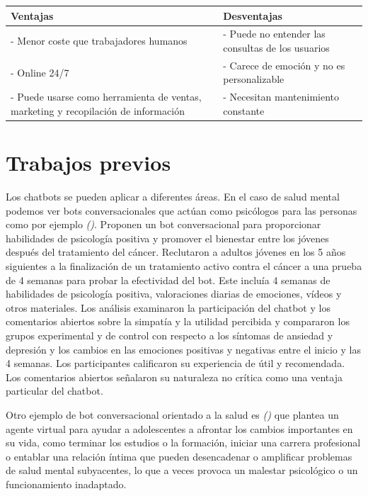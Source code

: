 {{{\begin{table}[!ht]
\begin{center}
\begin{tabular}{| p{6cm} | p{7cm} |}
\hline
\rowcolor{blueice}
\textbf{Ventajas} & \textbf{Desventajas} \\
 \hline
- Menor coste que trabajadores humanos & - Puede no entender las consultas de los usuarios \\
- Online 24/7 & - Carece de emoción y no es personalizable \\
- Puede usarse como herramienta de ventas, marketing y recopilación de información & - Necesitan mantenimiento constante \\ \hline
\end{tabular}
\end{center}
\end{table}



\section{Trabajos previos}

Los chatbots se pueden aplicar a diferentes áreas. En el caso de salud mental podemos ver bots conversacionales que actúan como psicólogos para las personas como por ejemplo \textit{(\cite{vivibot2019})}. Proponen un bot conversacional para proporcionar habilidades de psicología positiva y promover el bienestar entre los jóvenes después del tratamiento del cáncer. Reclutaron a adultos jóvenes en los 5 años siguientes a la finalización de un tratamiento activo contra el cáncer a una prueba de 4 semanas para probar la efectividad del bot. Este incluía 4 semanas de habilidades de psicología positiva, valoraciones diarias de emociones, vídeos y otros materiales. Los análisis examinaron la participación del chatbot y los comentarios abiertos sobre la simpatía y la utilidad percibida y compararon los grupos experimental y de control con respecto a los síntomas de ansiedad y depresión y los cambios en las emociones positivas y negativas entre el inicio y las 4 semanas. Los participantes calificaron su experiencia de útil y recomendada. Los comentarios abiertos señalaron su naturaleza no crítica como una ventaja particular del chatbot.{\vspace{0.3cm}

Otro ejemplo de bot conversacional orientado a la salud es \textit{(\cite{21daystressdetox2021})} que plantea un agente virtual para ayudar a adolescentes a afrontar los cambios importantes en su vida, como terminar los estudios o la formación, iniciar una carrera profesional o entablar una relación íntima que pueden desencadenar o amplificar problemas de salud mental subyacentes, lo que a veces provoca un malestar psicológico o un funcionamiento inadaptado. {\vspace{0.3cm}

}}}}}
